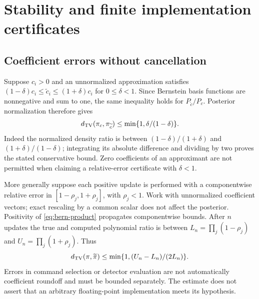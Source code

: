 \section{Stability and finite implementation certificates}\label{sec:stability}
\subsection{Coefficient errors without cancellation}
Suppose $c_i>0$ and an unnormalized approximation satisfies
$(1-\delta)c_i\le\widetilde c_i\le(1+\delta)c_i$ for $0\le\delta<1$.
Since Bernstein basis functions are nonnegative and sum to one, the same
inequality holds for $P_{\widetilde c}/P_c$. Posterior normalization therefore
gives
\begin{equation}
 d_{\mathrm{TV}}(\pi_c,\pi_{\widetilde c})\le
             \min\{1,\delta/(1-\delta)\}.
 \label{eq:posterior-error}
\end{equation}
Indeed the normalized density ratio is between
$(1-\delta)/(1+\delta)$ and $(1+\delta)/(1-\delta)$; integrating its
absolute difference and dividing by two proves the stated conservative
bound. Zero coefficients of an approximant are not permitted when claiming
a relative-error certificate with $\delta<1$.

More generally suppose each positive update is performed with a componentwise
relative error in $[1-\rho_j,1+\rho_j]$, with $\rho_j<1$. Work with
unnormalized coefficient vectors; exact rescaling by a common scalar does
not affect the posterior. Positivity of \eqref{eq:bern-product} propagates
componentwise bounds. After $n$ updates the true and computed polynomial
ratio is between $L_n=\prod_j(1-\rho_j)$ and
$U_n=\prod_j(1+\rho_j)$. Thus
\begin{equation}
 d_{\mathrm{TV}}(\pi,\widetilde\pi)\le
              \min\{1,(U_n-L_n)/(2L_n)\}.
 \label{eq:accumulated-error}
\end{equation}
Errors in command selection or detector evaluation are not automatically
coefficient roundoff and must be bounded separately. The estimate does not
assert that an arbitrary floating-point implementation meets its hypothesis.

